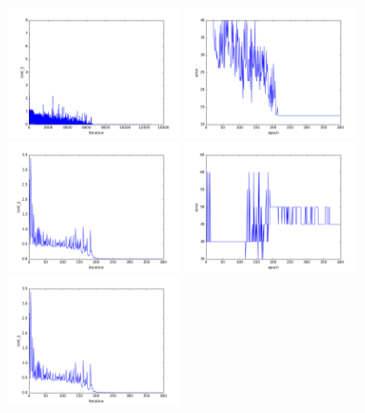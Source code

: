 \begin{figure}[htb]
\centering
\includegraphics[width=0.45\textwidth]{images/redes/ejecucion1/general_svm_frav/cost.png}
\includegraphics[width=0.45\textwidth]{images/redes/ejecucion1/general_svm_frav/error.png}
\includegraphics[width=0.45\textwidth]{images/redes/ejecucion1/general_svm_frav/minidataset/cost.png}
\includegraphics[width=0.45\textwidth]{images/redes/ejecucion1/general_svm_frav/minidataset/error.png}
\includegraphics[width=0.45\textwidth]{images/redes/ejecucion1/general_svm_frav/minidataset_tested_itself/cost.png}

\end{figure}
